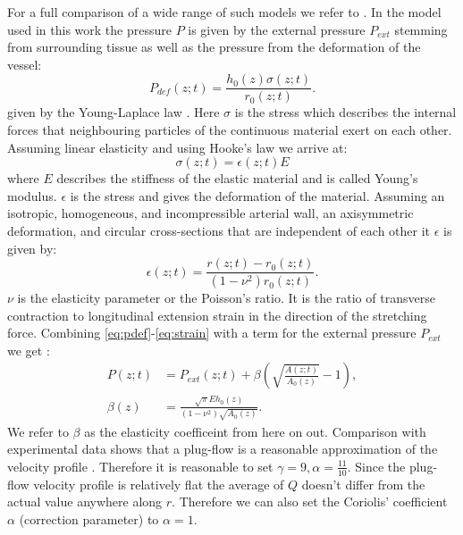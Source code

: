 \documentclass[a4paper, oneside]{discothesis}
\begin{document}
For a full comparison of a wide range of such models we refer to \cite{gomez2017analysis}.
In the model used in this work the pressure $P$ is given by the external pressure $P_{ext}$ stemming from surrounding tissue as well as the pressure from the deformation of the vessel:
\begin{equation}
	P_{def}(z;t) = \frac{h_0(z) \sigma(z;t)}{r_0(z;t)}. \label{eq:pdef}
\end{equation}
given by the Young-Laplace law \cite{laplace1805traité} \cite{young1804essay}.
Here $\sigma$ is the stress which describes the internal forces that neighbouring particles of the continuous material exert on each other.
Assuming linear elasticity and using Hooke's law \cite{hooke1678lectures} we arrive at:
\begin{equation}
	\sigma(z;t) = \epsilon(z;t) E \label{eq:stress}
\end{equation}
where $E$ describes the stiffness of the elastic material and is called Young's modulus.
$\epsilon$ is the stress and gives the deformation of the material.
Assuming an isotropic, homogeneous, and incompressible arterial wall, an axisymmetric deformation, and circular cross-sections that are independent of each other it $\epsilon$ is given by:
\begin{equation}
	\epsilon(z;t) = \frac{r(z;t)-r_0(z;t)}{ (1-\nu^2) r_0(z;t)}. \label{eq:strain}
\end{equation}
$\nu$ is the elasticity parameter or the Poisson's ratio.
It is the ratio of transverse contraction to longitudinal extension strain in the direction of the stretching force.
Combining \autoref{eq:pdef}-\autoref{eq:strain} with a term for the external pressure $P_{ext}$ we get \cite{sherwin2003one} \cite{sherwin2003computational}: 
\begin{align}
	P(z;t) &= P_{ext}(z;t) + \beta \left( \sqrt{\frac{A(z;t)}{A_0(z)}}-1 \right),  \label{eq:p_tot}\\
	\beta(z) &=  \frac{\sqrt{\pi} E h_0(z)}{(1-\nu^2) \sqrt{A_0(z)}}.
\end{align}
We refer to $\beta$ as the elasticity coefficeint from here on out.
Comparison with experimental data shows that a plug-flow is a reasonable approximation of the velocity profile \cite{hunter1972numerical} \cite{smith2000generation} \cite{smith2002anatomically}.
Therefore it is reasonable to set $\gamma = 9, \alpha = \frac{11}{10}$.
Since the plug-flow velocity profile is relatively flat the average of $Q$ doesn't differ from the actual value anywhere along $r$.
Therefore we can also set the Coriolis' coefficient $\alpha$ (correction parameter) to $\alpha = 1$. \cite{formaggia2010cardiovascular}
\end{document}
